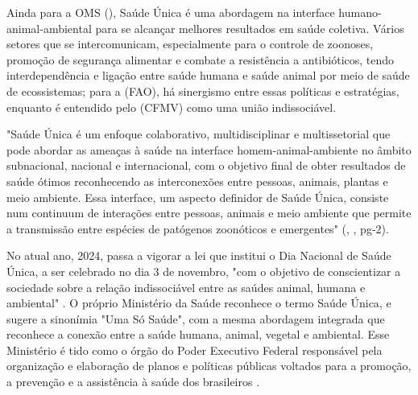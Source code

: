 
\indent Ainda para a \acrshort{OMS} (\citeyear{OMS2024S1}), Saúde Única é uma abordagem na interface humano-animal-ambiental para se alcançar melhores resultados em saúde coletiva. Vários setores que se intercomunicam, especialmente para o controle de zoonoses, promoção de segurança alimentar e combate a resistência a antibióticos, tendo interdependência e ligação entre saúde humana e saúde animal por meio de saúde de ecossistemas; para a  (\acrshort{FAO}), há sinergismo entre essas políticas e estratégias, enquanto é entendido pelo  (\acrshort{CFMV}) como uma união indissociável.

\begin{citacao}
"Saúde Única é um enfoque colaborativo, multidisciplinar e multissetorial que pode abordar as ameaças à saúde na interface homem-animal-ambiente no âmbito subnacional, nacional e internacional, com o objetivo final de obter resultados de saúde ótimos reconhecendo as interconexões entre pessoas, animais, plantas e meio ambiente. Essa  interface, um aspecto definidor de Saúde Única, consiste num continuum de interações entre pessoas, animais e meio ambiente que permite a transmissão entre espécies de patógenos zoonóticos e emergentes" (\citeauthor{S1_OPAS_OMS}, \citeyear{S1_OPAS_OMS}, pg-2).
\end{citacao}


\indent No atual ano, 2024, passa a vigorar a lei que institui o Dia Nacional de Saúde Única, a ser celebrado no dia 3 de novembro, "com o objetivo de conscientizar a sociedade sobre a relação indissociável entre as saúdes animal, humana e ambiental" \cite{BRASIL2024LeiS1}. O próprio Ministério da Saúde reconhece o termo Saúde Única, e sugere a sinonímia "Uma Só Saúde", com a mesma abordagem integrada que reconhece a conexão entre a saúde humana, animal, vegetal e ambiental. Esse Ministério é tido como o órgão do Poder Executivo Federal responsável pela organização e elaboração de planos e políticas públicas voltados para a promoção, a prevenção e a assistência à saúde dos brasileiros \cite{MinisterioSaudeS1}.

